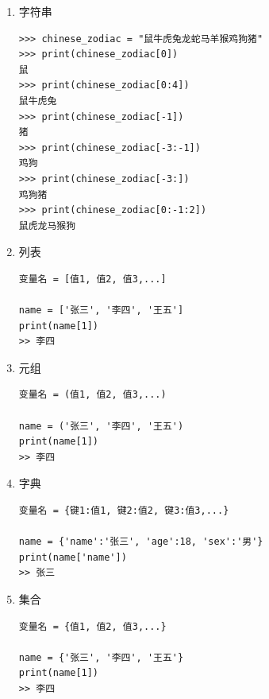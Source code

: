 \begin{enumerate}[label=\arabic*)]
    \item 字符串
\begin{lstlisting}[style=demostyle,numbers=none]
>>> chinese_zodiac = "鼠牛虎兔龙蛇马羊猴鸡狗猪"
>>> print(chinese_zodiac[0])
鼠
>>> print(chinese_zodiac[0:4])
鼠牛虎兔
>>> print(chinese_zodiac[-1])
猪
>>> print(chinese_zodiac[-3:-1])
鸡狗
>>> print(chinese_zodiac[-3:])
鸡狗猪
>>> print(chinese_zodiac[0:-1:2])
鼠虎龙马猴狗
\end{lstlisting}

    \item 列表
\begin{lstlisting}[style=demostyle,numbers=none]
变量名 = [值1, 值2, 值3,...]

name = ['张三', '李四', '王五']
print(name[1])
>> 李四
\end{lstlisting}

    \item 元组
\begin{lstlisting}[style=demostyle,numbers=none]
变量名 = (值1, 值2, 值3,...)

name = ('张三', '李四', '王五')
print(name[1])
>> 李四
\end{lstlisting}

    \item 字典
\begin{lstlisting}[style=demostyle,numbers=none]
变量名 = {键1:值1, 键2:值2, 键3:值3,...}

name = {'name':'张三', 'age':18, 'sex':'男'}
print(name['name'])
>> 张三
\end{lstlisting}

    \item 集合
\begin{lstlisting}[style=demostyle,numbers=none]
变量名 = {值1, 值2, 值3,...}

name = {'张三', '李四', '王五'}
print(name[1])
>> 李四
\end{lstlisting}
\end{enumerate}

